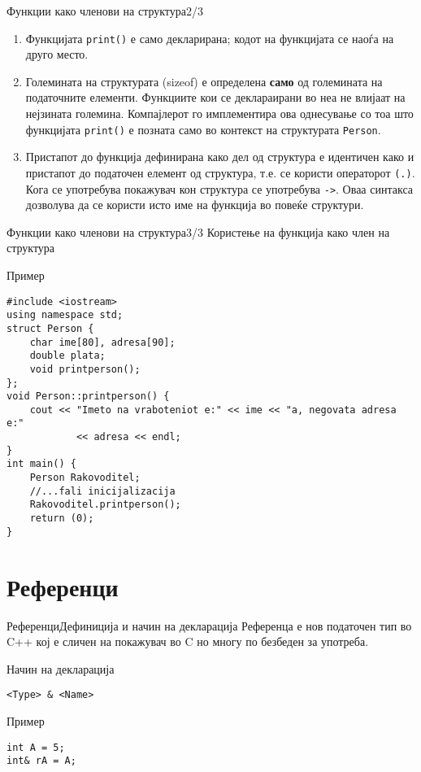 \begin{frame}{Функции како членови на структура}{2/3}
\begin{enumerate}
  \item Функцијата \texttt{print()} е само декларирана; кодот на функцијата се наоѓа на друго
место.
    \item Големината на структурата (sizeof) е определена \textbf{само} од големината на
податочните елементи. Функциите кои се деклараирани во неа не влијаат на
нејзината големина. Компајлерот го имплементира ова однесување со тоа што
функцијата \texttt{print()} е позната само во контекст на структурата \texttt{Person}.
\item  Пристапот до функција дефинирана како дел од структура е идентичен како и
пристапот до податочен елемент од структура, т.е. се користи операторот \texttt{(.)}.
Кога се употребува покажувач кон структура се употребува \texttt{->}. Оваа синтакса
дозволува да се користи исто име на функција во повеќе структури.
\end{enumerate}
\end{frame}

\begin{frame}[fragile]{Функции како членови на структура}{3/3}
Користење на функција како член на структура
\begin{exampleblock}{Пример}
\begin{lstlisting}
#include <iostream>
using namespace std;
struct Person {
    char ime[80], adresa[90];
    double plata;
    void printperson();
};
void Person::printperson() {
    cout << "Imeto na vraboteniot e:" << ime << "a, negovata adresa e:"
            << adresa << endl;
}
int main() {
    Person Rakovoditel;
    //...fali inicijalizacija
    Rakovoditel.printperson();
    return (0);
}
\end{lstlisting}
\end{exampleblock}
\end{frame}

\section{Референци}

\begin{frame}[fragile]{Референци}{Дефиниција и начин на декларација}
Референца е нов податочен тип во C++ кој е сличен на покажувач во C но многу по
безбеден за употреба.
\begin{exampleblock}{Начин на декларација}
\begin{lstlisting}
<Type> & <Name>
\end{lstlisting}
\end{exampleblock}

\begin{exampleblock}{Пример}
\begin{lstlisting}
int A = 5;
int& rA = A;
\end{lstlisting}
\end{exampleblock}
\end{frame}

